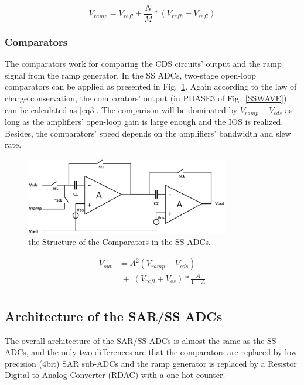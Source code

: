 \documentclass[conference]{IEEEtran}
\begin{document}
\begin{equation}
	V_{ramp}=V_{refl}+\frac{N}{M}\ast\left(V_{refh}-V_{refl}\right)
		\label{eq2}
\end{equation}

\subsubsection{Comparators}

The comparators work for comparing the CDS circuits' output and the ramp signal from the ramp generator. 
In the SS ADCs, two-stage open-loop comparators can be applied as presented in Fig.~\ref{COM}. Again according to the law of charge conservation, 
the comparators’ output (in PHASE3 of Fig.~\ref{SSWAVE}) can be calculated as \eqref{eq3}. The comparison will be dominated by $V_{ramp}-V_{cds}$ as long as the amplifiers’ open-loop gain 
is large enough and the IOS is realized. Besides, the comparators’ speed depends on the amplifiers’ bandwidth and slew rate.

\begin{figure}[htbp]
	\centerline{\includegraphics[width=3.5in]{./Figures/COM.eps}}
	\caption{the Structure of the Comparators in the SS ADCs.}
	\label{COM}
\end{figure} 

\begin{equation}
	\begin{aligned}
		V_{out}&=A^2(V_{ramp}-V_{cds})\\
		&\;{+}\;\left(V_{refl}+V_{os}\right)\ast\frac{A}{1+A}\\ 		
		\label{eq3}
	\end{aligned}
\end{equation}

\subsection{Architecture of the SAR/SS ADCs}

The overall architecture of the SAR/SS ADCs is almost the same as the SS ADCs, and the only two differences are that the comparators are replaced by low-precision (4bit) SAR sub-ADCs and
the ramp generator is replaced by a Resistor Digital-to-Analog Converter (RDAC) with a one-hot counter.
\end{document}
